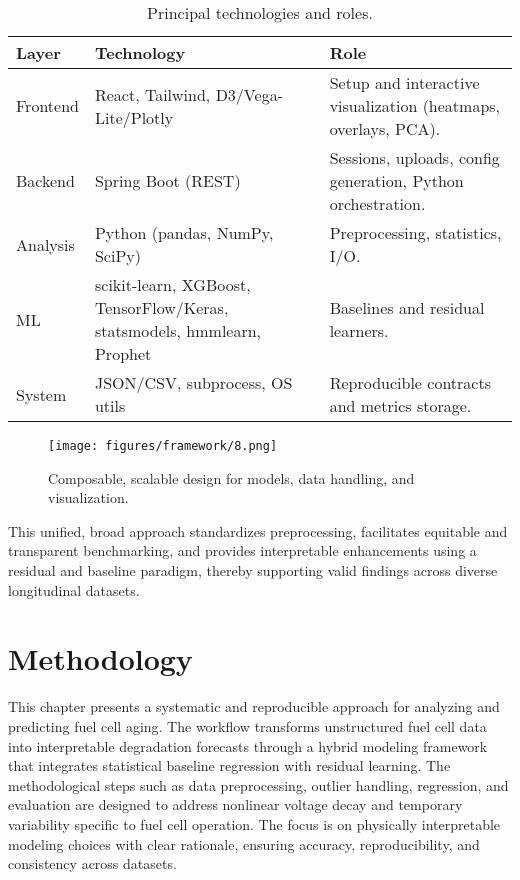 \begin{table}[H]
\centering
\renewcommand{\arraystretch}{1.2}
\caption{Principal technologies and roles.}
\label{tab:tech_stack_ts}
\begin{tabular}{p{2.0cm} p{4.1cm} p{6.8cm}}
\hline
\textbf{Layer} & \textbf{Technology} & \textbf{Role} \\
\hline
Frontend & React, Tailwind, D3/Vega-Lite/Plotly & Setup and interactive visualization (heatmaps, overlays, PCA). \\
Backend & Spring Boot (REST) & Sessions, uploads, config generation, Python orchestration. \\
Analysis & Python (pandas, NumPy, SciPy) & Preprocessing, statistics, I/O. \\
ML & scikit-learn, XGBoost, TensorFlow/Keras, statsmodels, hmmlearn, Prophet & Baselines and residual learners. \\
System & JSON/CSV, subprocess, OS utils & Reproducible contracts and metrics storage. \\
\hline
\end{tabular}
\end{table}

\begin{figure}[H]
 \centering
 \texttt{[image: figures/framework/8.png]}
 \caption[Composable, scalable design]{Composable, scalable design for models, data handling, and visualization.}
 \label{fig:extensibility_ts}
\end{figure}

\noindent
This unified, broad approach standardizes preprocessing, facilitates equitable and transparent benchmarking, and provides interpretable enhancements using a residual and baseline paradigm, thereby supporting valid findings across diverse longitudinal datasets.



\chapter{Methodology}
\label{chap:methodology}

This chapter presents a systematic and reproducible approach for analyzing and predicting fuel cell aging. The workflow transforms unstructured fuel cell data into interpretable degradation forecasts through a hybrid modeling framework that integrates statistical baseline regression with residual learning. The methodological steps such as data preprocessing, outlier handling, regression, and evaluation are designed to address nonlinear voltage decay and temporary variability specific to fuel cell operation. The focus is on physically interpretable modeling choices with clear rationale, ensuring accuracy, reproducibility, and consistency across datasets.
